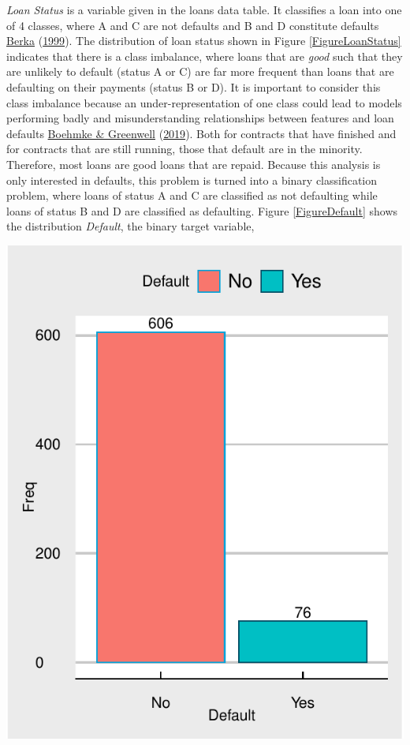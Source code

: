 \documentclass[11pt,preprint, authoryear]{elsarticle}
\let\origfigure\figure
\let\endorigfigure\endfigure
\renewenvironment{figure}[1][2] {
    \expandafter\origfigure\expandafter[H]
} {
    \endorigfigure
}
\numberwithin{equation}{section}
\numberwithin{figure}{section}
\numberwithin{table}{section}
\begin{document}
\emph{Loan Status} is a variable given in the loans data table. It
classifies a loan into one of 4 classes, where A and C are not defaults
and B and D constitute defaults \protect\hyperlink{ref-Data}{Berka}
(\protect\hyperlink{ref-Data}{1999}). The distribution of loan status
shown in Figure \ref{FigureLoanStatus} indicates that there is a class
imbalance, where loans that are \emph{good} such that they are unlikely
to default (status A or C) are far more frequent than loans that are
defaulting on their payments (status B or D). It is important to
consider this class imbalance because an under-representation of one
class could lead to models performing badly and misunderstanding
relationships between features and loan defaults
\protect\hyperlink{ref-Boehmke}{Boehmke \& Greenwell}
(\protect\hyperlink{ref-Boehmke}{2019}). Both for contracts that have
finished and for contracts that are still running, those that default
are in the minority. Therefore, most loans are good loans that are
repaid. Because this analysis is only interested in defaults, this
problem is turned into a binary classification problem, where loans of
status A and C are classified as not defaulting while loans of status B
and D are classified as defaulting. Figure \ref{FigureDefault} shows the
distribution \emph{Default}, the binary target variable,

\begin{figure}[H]

{\centering \includegraphics{DS-Report-20065124_files/figure-latex/FigureDefault-1} 

}

\caption{Binary Loan Defaults \label{FigureDefault}}\label{fig:FigureDefault}
\end{figure}
\end{document}
